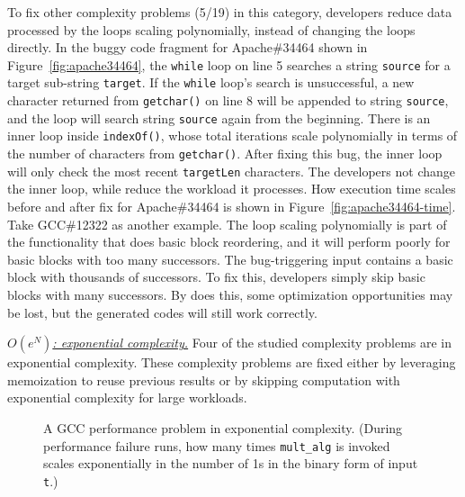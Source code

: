 To fix other complexity problems (5/19) in this category,
developers reduce data processed by the loops scaling polynomially, 
instead of changing the loops directly.
In the buggy code fragment for Apache\#34464 shown in Figure~\ref{fig:apache34464},
the \texttt{while} loop on line 5 searches a string \texttt{source}
for a target sub-string \texttt{target}.
If the \texttt{while} loop's search is unsuccessful, 
a new character returned from \texttt{getchar()} on line 8 will be appended to string \texttt{source}, 
and the loop will search string \texttt{source} again from the beginning. 
There is an inner loop inside \texttt{indexOf()}, whose total iterations 
scale polynomially in terms of the number of characters from \texttt{getchar()}. 
After fixing this bug, the inner loop will only check the most recent \texttt{targetLen} characters.
The developers not change the inner loop, 
while reduce the workload it processes.   
How execution time scales before and after fix for 
Apache\#34464 is shown in Figure~\ref{fig:apache34464-time}.
Take GCC\#12322 as another example.
The loop scaling polynomially is part of the functionality that does basic block reordering,
and it will perform poorly for basic blocks with too many successors. 
The bug-triggering input contains a basic block with thousands of successors. 
To fix this, developers simply skip basic blocks with many successors.
By does this, some optimization opportunities may be lost, 
but the generated codes will still work correctly. 


{\underline{\textit{$O(e^N)$: exponential complexity.}}}
Four of the studied complexity problems are in exponential complexity. 
These complexity problems are fixed 
either by leveraging memoization to reuse previous results 
or by skipping computation with exponential complexity for large workloads. 



\begin{figure}
\centering
{}
  \mbox{}
\caption{A GCC performance problem in exponential complexity. 
 \footnotesize{(During performance failure runs, how many times \texttt{mult\_alg} is invoked scales exponentially
  in the number of 1s in the binary form of input \texttt{t}.)}}
\vspace{-0.05in}
\label{fig:gcc27733}
\vspace{-0.05in}
\end{figure}


